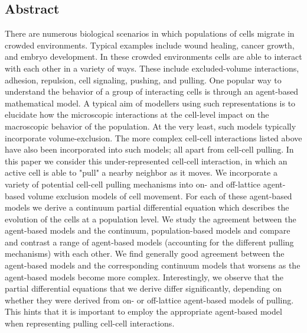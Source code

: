 \documentclass[11pt,a4paper]{article}
\begin{document}
\subsection*{Abstract}
There are numerous biological scenarios in which populations of cells migrate in crowded environments. Typical examples include wound healing, cancer growth, and embryo development. In these crowded environments cells are able to interact with each other in a variety of ways. These include excluded-volume interactions, adhesion, repulsion, cell signaling, pushing, and pulling. One popular way to understand the behavior of a group of interacting cells is through an agent-based mathematical model. A typical aim of modellers using such representations is to elucidate how the microscopic interactions at the cell-level impact on the macroscopic behavior of the population. At the very least, such models typically incorporate volume-exclusion. The more complex cell-cell interactions listed above have also been incorporated into such models; all apart from cell-cell pulling. In this paper we consider this under-represented cell-cell interaction, in which an active cell is able to "pull" a nearby neighbor as it moves. We incorporate a variety of potential cell-cell pulling mechanisms into on- and off-lattice agent-based volume exclusion models of cell movement. For each of these agent-based models we derive a continuum partial differential equation which describes the evolution of the cells at a population level. We study the agreement between the agent-based models and the continuum, population-based models and compare and contrast a range of agent-based models (accounting for the different pulling mechanisms) with each other. We find generally good agreement between the agent-based models and the corresponding continuum models that worsens as the agent-based models become more complex. Interestingly, we observe that the partial differential equations that we derive differ significantly, depending on whether they were derived from on- or off-lattice agent-based models of pulling. This hints that it is important to employ the appropriate agent-based model when representing pulling cell-cell interactions. 
\end{document}
